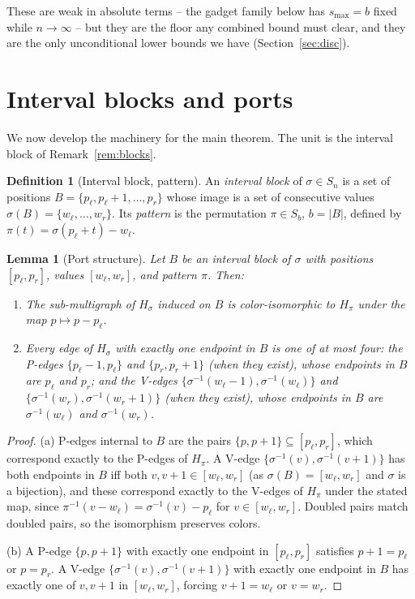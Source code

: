 \documentclass[11pt]{article}
\newtheorem{lemma}[theorem]{Lemma}
\theoremstyle{definition}
\newtheorem{definition}[theorem]{Definition}
\newcommand{\inv}[1]{#1^{-1}}
\newcommand{\smax}{s_{\max}}
\begin{document}
These are weak in absolute terms -- the gadget family below has $\smax=b$ fixed while
$n\to\infty$ -- but they are the floor any combined bound must clear, and they are the
only unconditional lower bounds we have (Section~\ref{sec:disc}).

\section{Interval blocks and ports}\label{sec:ports}

We now develop the machinery for the main theorem. The unit is the interval block of
Remark~\ref{rem:blocks}.

\begin{definition}[Interval block, pattern]\label{def:block}
An \emph{interval block} of $\sigma \in S_n$ is a set of positions
$B = \{p_\ell, p_\ell + 1, \dots, p_r\}$ whose image is a set of consecutive values
$\sigma(B) = \{w_\ell, \dots, w_r\}$. Its \emph{pattern} is the permutation
$\pi \in S_b$, $b = |B|$, defined by $\pi(t) = \sigma(p_\ell + t) - w_\ell$.
\end{definition}

\begin{lemma}[Port structure]\label{lem:ports}
Let $B$ be an interval block of $\sigma$ with positions $[p_\ell,p_r]$, values
$[w_\ell,w_r]$, and pattern $\pi$. Then:
\begin{enumerate}
\item[(a)] The sub-multigraph of $H_\sigma$ induced on $B$ is color-isomorphic to
$H_\pi$ under the map $p \mapsto p - p_\ell$.
\item[(b)] Every edge of $H_\sigma$ with exactly one endpoint in $B$ is one of at most
four: the P-edges $\{p_\ell - 1, p_\ell\}$ and $\{p_r, p_r + 1\}$ (when they exist),
whose endpoints in $B$ are $p_\ell$ and $p_r$; and the V-edges
$\{\inv\sigma(w_\ell - 1), \inv\sigma(w_\ell)\}$ and
$\{\inv\sigma(w_r), \inv\sigma(w_r + 1)\}$ (when they exist), whose endpoints in $B$
are $\inv\sigma(w_\ell)$ and $\inv\sigma(w_r)$.
\end{enumerate}
\end{lemma}

\begin{proof}
(a) P-edges internal to $B$ are the pairs $\{p, p+1\} \subseteq [p_\ell, p_r]$, which
correspond exactly to the P-edges of $H_\pi$. A V-edge
$\{\inv\sigma(v), \inv\sigma(v+1)\}$ has both endpoints in $B$ iff both
$v, v+1 \in [w_\ell, w_r]$ (as $\sigma(B) = [w_\ell, w_r]$ and $\sigma$ is a
bijection), and these correspond exactly to the V-edges of $H_\pi$ under the stated
map, since $\inv\pi(v - w_\ell) = \inv\sigma(v) - p_\ell$ for $v \in [w_\ell, w_r]$.
Doubled pairs match doubled pairs, so the isomorphism preserves colors.

(b) A P-edge $\{p, p+1\}$ with exactly one endpoint in $[p_\ell, p_r]$ satisfies
$p + 1 = p_\ell$ or $p = p_r$. A V-edge $\{\inv\sigma(v), \inv\sigma(v+1)\}$ with
exactly one endpoint in $B$ has exactly one of $v, v+1$ in $[w_\ell, w_r]$, forcing
$v + 1 = w_\ell$ or $v = w_r$.
\end{proof}
\end{document}
